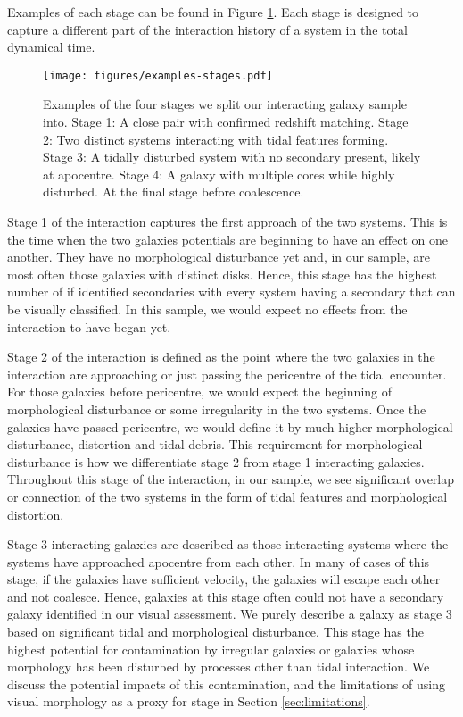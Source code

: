 \documentclass[fleqn,usenatbib]{mnras}
\begin{document}
\noindent Examples of each stage can be found in Figure \ref{fig:stages}. Each stage is designed to capture a different part of the interaction history of a system in the total dynamical time.

\begin{figure}
    \centering
    \texttt{[image: figures/examples-stages.pdf]}
    \caption{Examples of the four stages we split our interacting galaxy sample into. Stage 1: A close pair with confirmed redshift matching. Stage 2: Two distinct systems interacting with tidal features forming. Stage 3: A tidally disturbed system with no secondary present, likely at apocentre. Stage 4: A galaxy with multiple cores while highly disturbed. At the final stage before coalescence.}
    \label{fig:stages}
\end{figure}

Stage 1 of the interaction captures the first approach of the two systems. This is the time when the two galaxies potentials are beginning to have an effect on one another. They have no morphological disturbance yet and, in our sample, are most often those galaxies with distinct disks. Hence, this stage has the highest number of if identified secondaries with every system having a secondary that can be visually classified. In this sample, we would expect no effects from the interaction to have began yet. 

Stage 2 of the interaction is defined as the point where the two galaxies in the interaction are approaching or just passing the pericentre of the tidal encounter. For those galaxies before pericentre, we would expect the beginning of morphological disturbance or some irregularity in the two systems. Once the galaxies have passed pericentre, we would define it by much higher morphological disturbance, distortion and tidal debris. This requirement for morphological disturbance is how we differentiate stage 2 from stage 1 interacting galaxies. Throughout this stage of the interaction, in our sample, we see significant overlap or connection of the two systems in the form of tidal features and morphological distortion.

Stage 3 interacting galaxies are described as those interacting systems where the systems have approached apocentre from each other. In many of cases of this stage, if the galaxies have sufficient velocity, the galaxies will escape each other and not coalesce. Hence, galaxies at this stage often could not have a secondary galaxy identified in our visual assessment. We purely describe a galaxy as stage 3 based on significant tidal and morphological disturbance. This stage has the highest potential for contamination by irregular galaxies or galaxies whose morphology has been disturbed by processes other than tidal interaction. We discuss the potential impacts of this contamination, and the limitations of using visual morphology as a proxy for stage in Section \ref{sec:limitations}. 
\end{document}
